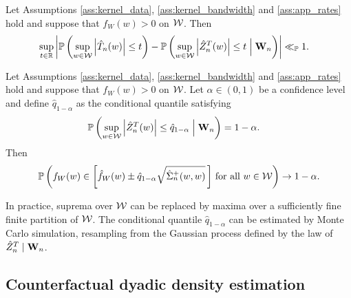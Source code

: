 \begin{lemma}
  \label{lem:feasible_gaussian_approx}

  Let Assumptions \ref{ass:kernel_data}, \ref{ass:kernel_bandwidth}
  and \ref{ass:app_rates} hold and suppose that $f_W(w) > 0$ on $\mathcal{W}$.
  Then
  \begin{align*}
    \sup_{t \in \mathbb{R}}
    \left|
    \mathbb{P}\left(
      \sup_{w \in \mathcal{W}}
      \left| \hat T_n(w) \right|
      \leq t
    \right)
    - \mathbb{P}\left(
      \sup_{w \in \mathcal{W}}
      \left| \hat Z_n^T(w) \right|
      \leq t
      \Bigm\vert \mathbf{W}_n
    \right)
    \right|
    &\ll_{\mathbb{P}}
    1.
  \end{align*}

\end{lemma}

\begin{theorem}
  \label{thm:kernel_app_ucb}

  Let Assumptions \ref{ass:kernel_data}, \ref{ass:kernel_bandwidth}
  and \ref{ass:app_rates} hold and suppose that $f_W(w) > 0$ on $\mathcal{W}$.
  Let $\alpha \in (0,1)$ be a confidence level
  and define $\hat q_{1-\alpha}$ as the
  conditional quantile satisfying
  \begin{align*}
    \mathbb{P}\left(
      \sup_{w \in \mathcal{W}}
      \left| \hat Z_n^T(w) \right|
      \leq \hat q_{1-\alpha}
      \Bigm\vert \mathbf{W}_n
    \right)
    &=
    1 - \alpha.
  \end{align*}
  Then
  \begin{align*}
    \mathbb{P}\left(
      f_W(w)
      \in
      \left[
        \hat f_W(w)
        \pm
        \hat q_{1-\alpha}
        \sqrt{\hat\Sigma_n^+(w,w)}
      \,\right]
      \,\textup{for all }
      w \in \mathcal{W}
    \right)
    \to 1 - \alpha.
  \end{align*}

\end{theorem}

\begin{remark}

  In practice, suprema over $\mathcal{W}$ can be
  replaced by maxima over a sufficiently fine finite partition of $\mathcal{W}$.
  The conditional quantile $\hat q_{1-\alpha}$
  can be estimated by Monte Carlo
  simulation,
  resampling from the Gaussian process defined by the law of
  $\hat Z_n^T \mid \mathbf{W}_n$.
\end{remark}

\subsection{Counterfactual
dyadic density estimation}
\label{subsec:counterfactual}

